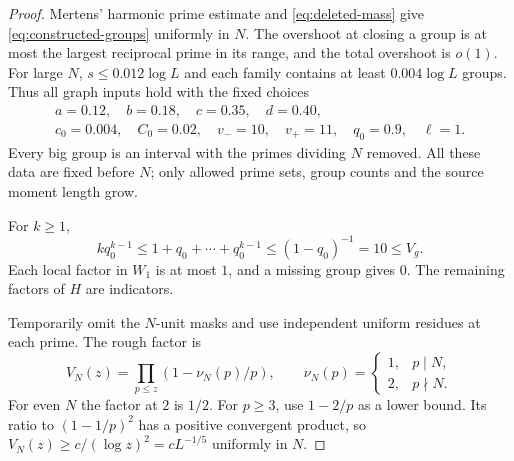 \documentclass[11pt]{article}
\theoremstyle{definition}
\theoremstyle{remark}
\begin{document}
\begin{proof}
Mertens' harmonic prime estimate and \eqref{eq:deleted-mass} give
\eqref{eq:constructed-groups} uniformly in $N$.
The overshoot at closing a group is at most the largest reciprocal
prime in its range, and the total overshoot is $o(1)$.
For large $N$, $s\le0.012\log L$ and each family contains at least
$0.004\log L$ groups.
Thus all graph inputs hold with the fixed choices
\begin{equation}\label{eq:numerical-graph-data}
\begin{gathered}
a=0.12,\quad b=0.18,\quad c=0.35,\quad d=0.40,\\
c_0=0.004,\quad C_0=0.02,\quad v_-=10,\quad v_+=11,\quad
q_0=0.9,\quad\ell=1.
\end{gathered}
\end{equation}
Every big group is an interval with the primes dividing $N$ removed.
All these data are fixed before $N$; only allowed prime sets,
group counts and the source moment length grow.

For $k\ge1$,
\begin{equation}\label{eq:pointwise-local}
kq_0^{k-1}\le1+q_0+\cdots+q_0^{k-1}
\le(1-q_0)^{-1}=10\le V_g.
\end{equation}
Each local factor in $W_1$ is at most $1$, and a missing group
gives $0$. The remaining factors of $H$ are indicators.

Temporarily omit the $N$-unit masks and use independent uniform
residues at each prime. The rough factor is
\begin{equation}\label{eq:rough-euler}
V_N(z)=\prod_{p\le z}(1-\nu_N(p)/p),\qquad
\nu_N(p)=
\begin{cases}1,&p\mid N,\\2,&p\nmid N.\end{cases}
\end{equation}
For even $N$ the factor at $2$ is $1/2$. For $p\ge3$, use
$1-2/p$ as a lower bound. Its ratio to $(1-1/p)^2$ has a positive
convergent product, so
$V_N(z)\ge c/(\log z)^2=cL^{-1/5}$ uniformly in $N$.


\end{proof}
\end{document}

